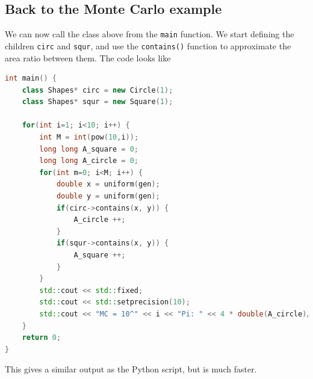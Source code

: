 \subsection{Back to the Monte Carlo example}
We can now call the class above from the \texttt{main} function. We start defining the children \texttt{circ} and \texttt{squr}, and use the \texttt{contains()} function to approximate the area ratio between them. The code looks like 
\begin{lstlisting}[language=c++]
int main() {   
	class Shapes* circ = new Circle(1);
	class Shapes* squr = new Square(1);

	for(int i=1; i<10; i++) {
		int M = int(pow(10,i));
		long long A_square = 0;
		long long A_circle = 0;
		for(int m=0; i<M; i++) {
			double x = uniform(gen);
			double y = uniform(gen);
			if(circ->contains(x, y)) {
				A_circle ++;
			}
			if(squr->contains(x, y)) {
				A_square ++;
			}
		}
		std::cout << std::fixed;
		std::cout << std::setprecision(10);
		std::cout << "MC = 10^" << i << "Pi: " << 4 * double(A_circle)/A_square << std::endl;
	}
	return 0;
}
\end{lstlisting}
This gives a similar output as the Python script, but is much faster.


